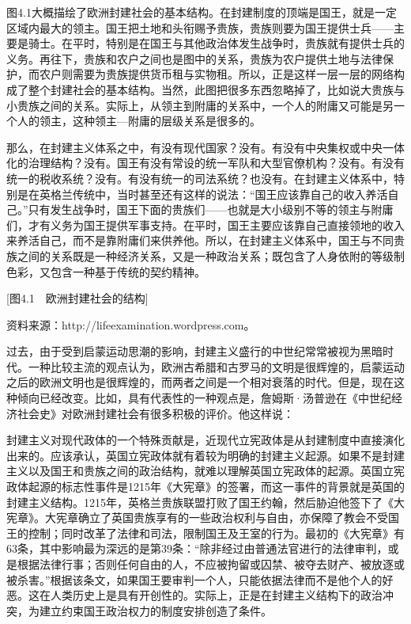 图4.1大概描绘了欧洲封建社会的基本结构。在封建制度的顶端是国王，就是一定区域内最大的领主。国王把土地和头衔赐予贵族，贵族则要为国王提供士兵——主要是骑士。在平时，特别是在国王与其他政治体发生战争时，贵族就有提供士兵的义务。再往下，贵族和农户之间也是图中的关系，贵族为农户提供土地与法律保护，而农户则需要为贵族提供货币租与实物租。所以，正是这样一层一层的网络构成了整个封建社会的基本结构。当然，此图把很多东西忽略掉了，比如说大贵族与小贵族之间的关系。实际上，从领主到附庸的关系中，一个人的附庸又可能是另一个人的领主，这种领主—附庸的层级关系是很多的。

那么，在封建主义体系之中，有没有现代国家？没有。有没有中央集权或中央一体化的治理结构？没有。国王有没有常设的统一军队和大型官僚机构？没有。有没有统一的税收系统？没有。有没有统一的司法系统？也没有。在封建主义体系中，特别是在英格兰传统中，当时甚至还有这样的说法：“国王应该靠自己的收入养活自己。”只有发生战争时，国王下面的贵族们——也就是大小级别不等的领主与附庸们，才有义务为国王提供军事支持。在平时，国王主要应该靠自己直接领地的收入来养活自己，而不是靠附庸们来供养他。所以，在封建主义体系中，国王与不同贵族之间的关系既是一种经济关系，又是一种政治关系；既包含了人身依附的等级制色彩，又包含一种基于传统的契约精神。

[图4.1　欧洲封建社会的结构]

资料来源：http://lifeexamination.wordpress.com。

过去，由于受到启蒙运动思潮的影响，封建主义盛行的中世纪常常被视为黑暗时代。一种比较主流的观点认为，欧洲古希腊和古罗马的文明是很辉煌的，启蒙运动之后的欧洲文明也是很辉煌的，而两者之间是一个相对衰落的时代。但是，现在这种倾向已经改变。比如，具有代表性的一种观点是，詹姆斯·汤普逊在《中世纪经济社会史》对欧洲封建社会有很多积极的评价。他这样说：


封建主义对现代政体的一个特殊贡献是，近现代立宪政体是从封建制度中直接演化出来的。应该承认，英国立宪政体就有着较为明确的封建主义起源。如果不是封建主义以及国王和贵族之间的政治结构，就难以理解英国立宪政体的起源。英国立宪政体起源的标志性事件是1215年《大宪章》的签署，而这一事件的背景就是英国的封建主义结构。1215年，英格兰贵族联盟打败了国王约翰，然后胁迫他签下了《大宪章》。大宪章确立了英国贵族享有的一些政治权利与自由，亦保障了教会不受国王的控制；同时改革了法律和司法，限制国王及王室的行为。最初的《大宪章》有63条，其中影响最为深远的是第39条：“除非经过由普通法官进行的法律审判，或是根据法律行事；否则任何自由的人，不应被拘留或囚禁、被夺去财产、被放逐或被杀害。”根据该条文，如果国王要审判一个人，只能依据法律而不是他个人的好恶。这在人类历史上是具有开创性的。实际上，正是在封建主义结构下的政治冲突，为建立约束国王政治权力的制度安排创造了条件。

